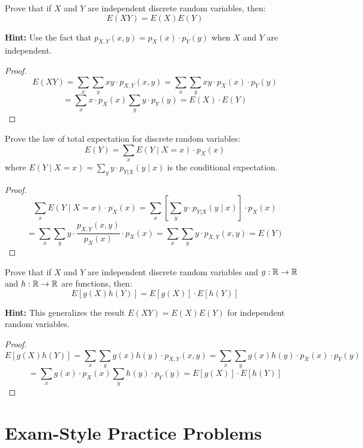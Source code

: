 \begin{exercise}
Prove that if $X$ and $Y$ are independent discrete random variables, then:
\[
E(XY) = E(X)E(Y)
\]

\textbf{Hint:} Use the fact that $p_{X,Y}(x, y) = p_X(x) \cdot p_Y(y)$ when $X$ and $Y$ are independent.
\end{exercise}

\begin{proof}
\[
E(XY) = \sum_{x} \sum_{y} xy \cdot p_{X,Y}(x, y) = \sum_{x} \sum_{y} xy \cdot p_X(x) \cdot p_Y(y)
\]
\[
= \sum_{x} x \cdot p_X(x) \sum_{y} y \cdot p_Y(y) = E(X) \cdot E(Y)
\]
\end{proof}

\begin{exercise}
Prove the law of total expectation for discrete random variables:
\[
E(Y) = \sum_{x} E(Y \mid X = x) \cdot p_X(x)
\]
where $E(Y \mid X = x) = \sum_{y} y \cdot p_{Y|X}(y \mid x)$ is the conditional expectation.
\end{exercise}

\begin{proof}
\[
\sum_{x} E(Y \mid X = x) \cdot p_X(x) = \sum_{x} \left[ \sum_{y} y \cdot p_{Y|X}(y \mid x) \right] \cdot p_X(x)
\]
\[
= \sum_{x} \sum_{y} y \cdot \frac{p_{X,Y}(x, y)}{p_X(x)} \cdot p_X(x) = \sum_{x} \sum_{y} y \cdot p_{X,Y}(x, y) = E(Y)
\]
\end{proof}

\begin{exercise}
Prove that if $X$ and $Y$ are independent discrete random variables and $g: \mathbb{R} \to \mathbb{R}$ and $h: \mathbb{R} \to \mathbb{R}$ are functions, then:
\[
E[g(X)h(Y)] = E[g(X)] \cdot E[h(Y)]
\]

\textbf{Hint:} This generalizes the result $E(XY) = E(X)E(Y)$ for independent random variables.
\end{exercise}

\begin{proof}
\[
E[g(X)h(Y)] = \sum_{x} \sum_{y} g(x)h(y) \cdot p_{X,Y}(x, y) = \sum_{x} \sum_{y} g(x)h(y) \cdot p_X(x) \cdot p_Y(y)
\]
\[
= \sum_{x} g(x) \cdot p_X(x) \sum_{y} h(y) \cdot p_Y(y) = E[g(X)] \cdot E[h(Y)]
\]
\end{proof}

\newpage

\section{Exam-Style Practice Problems}

